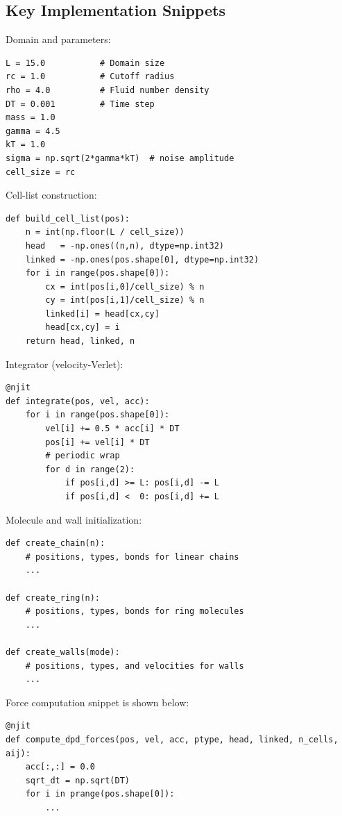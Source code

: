 \documentclass[11pt,a4paper]{article}
\begin{document}
\subsection{Key Implementation Snippets}
Domain and parameters:
\begin{lstlisting}[caption={Global Constants and Parameter Choices}]
L = 15.0           # Domain size
rc = 1.0           # Cutoff radius
rho = 4.0          # Fluid number density
DT = 0.001         # Time step
mass = 1.0
gamma = 4.5
kT = 1.0
sigma = np.sqrt(2*gamma*kT)  # noise amplitude
cell_size = rc
\end{lstlisting}

Cell-list construction:
\begin{lstlisting}[caption={build\_cell\_list (neighbor search)}]
def build_cell_list(pos):
    n = int(np.floor(L / cell_size))
    head   = -np.ones((n,n), dtype=np.int32)
    linked = -np.ones(pos.shape[0], dtype=np.int32)
    for i in range(pos.shape[0]):
        cx = int(pos[i,0]/cell_size) % n
        cy = int(pos[i,1]/cell_size) % n
        linked[i] = head[cx,cy]
        head[cx,cy] = i
    return head, linked, n
\end{lstlisting}

Integrator (velocity-Verlet):
\begin{lstlisting}[caption={integrate (Velocity-Verlet step)}]
@njit
def integrate(pos, vel, acc):
    for i in range(pos.shape[0]):
        vel[i] += 0.5 * acc[i] * DT
        pos[i] += vel[i] * DT
        # periodic wrap
        for d in range(2):
            if pos[i,d] >= L: pos[i,d] -= L
            if pos[i,d] <  0: pos[i,d] += L
\end{lstlisting}

Molecule and wall initialization:
\begin{lstlisting}[caption={create\_chain, create\_ring, create\_walls}]
def create_chain(n):
    # positions, types, bonds for linear chains
    ...

def create_ring(n):
    # positions, types, bonds for ring molecules
    ...

def create_walls(mode):
    # positions, types, and velocities for walls
    ...
\end{lstlisting}

Force computation snippet is shown below:
\begin{lstlisting}[caption={compute\_dpd\_forces (DPD force model)}]
@njit
def compute_dpd_forces(pos, vel, acc, ptype, head, linked, n_cells, aij):
    acc[:,:] = 0.0
    sqrt_dt = np.sqrt(DT)
    for i in prange(pos.shape[0]):
        ...
\end{lstlisting}
\end{document}
